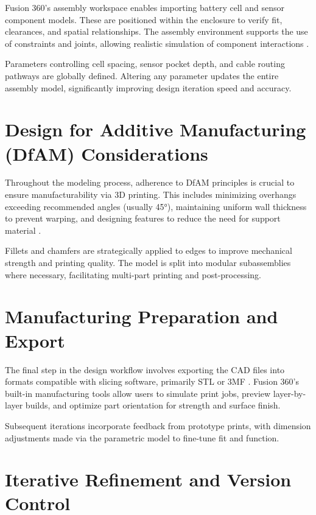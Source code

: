 Fusion 360’s assembly workspace enables importing battery cell and sensor component models. These are positioned within the enclosure to verify fit, clearances, and spatial relationships. The assembly environment supports the use of constraints and joints, allowing realistic simulation of component interactions \cite{hogan2025}.

Parameters controlling cell spacing, sensor pocket depth, and cable routing pathways are globally defined. Altering any parameter updates the entire assembly model, significantly improving design iteration speed and accuracy.

\section{Design for Additive Manufacturing (DfAM) Considerations}

Throughout the modeling process, adherence to DfAM principles is crucial to ensure manufacturability via 3D printing. This includes minimizing overhangs exceeding recommended angles (usually 45°), maintaining uniform wall thickness to prevent warping, and designing features to reduce the need for support material \cite{anderson2020}.

Fillets and chamfers are strategically applied to edges to improve mechanical strength and printing quality. The model is split into modular subassemblies where necessary, facilitating multi-part printing and post-processing.

\section{Manufacturing Preparation and Export}

The final step in the design workflow involves exporting the CAD files into formats compatible with slicing software, primarily STL or 3MF \cite{gebhardt2016}. Fusion 360’s built-in manufacturing tools allow users to simulate print jobs, preview layer-by-layer builds, and optimize part orientation for strength and surface finish.

Subsequent iterations incorporate feedback from prototype prints, with dimension adjustments made via the parametric model to fine-tune fit and function.

\section{Iterative Refinement and Version Control}


